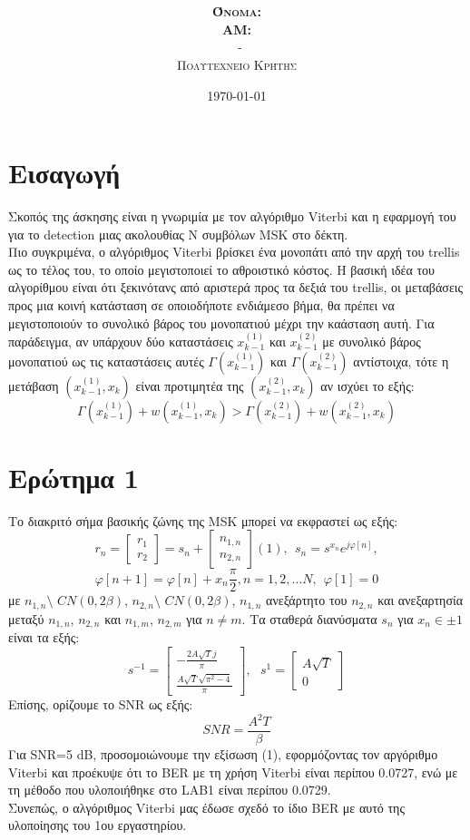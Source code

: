 \documentclass{article}
\title{\underline{\textbf{\assignmentNumber}}}
\author{\textsc{\textbf{Όνομα:}}  \studentName\\
		\textsc{\textbf{ΑΜ:}}  \studentNumber\\
		\course \ - \courseName\\ 
		\textsc{Πολυτεχνείο Κρήτης}
}
\date{\today}
\begin{document}
	\maketitle
\section{Εισαγωγή}
Σκοπός της άσκησης είναι η γνωριμία με τον αλγόριθμο Viterbi και η εφαρμογή του για το detection μιας ακολουθίας Ν συμβόλων MSK στο δέκτη.\\
Πιο συγκριμένα, ο αλγόριθμος Viterbi βρίσκει ένα μονοπάτι από την αρχή του trellis ως το τέλος του, το οποίο μεγιστοποιεί το αθροιστικό κόστος. Η βασική  ιδέα του αλγορίθμου είναι ότι ξεκινότανς από αριστερά προς τα δεξιά του trellis, οι μεταβάσεις προς μια κοινή κατάσταση σε οποιοδήποτε ενδιάμεσο βήμα, θα πρέπει να μεγιστοποιούν το συνολικό βάρος του μονοπατιού μέχρι την καάσταση αυτή.
Για παράδειγμα, αν υπάρχουν δύο καταστάσεις $x_{k-1}^{(1)}$ και $x_{k-1}^{(2)}$ με συνολικό βάρος μονοπατιού ως τις καταστάσεις αυτές $Γ(x_{k-1}^{(1)})$ και $Γ(x_{k-1}^{(2)})$ αντίστοιχα, τότε η μετάβαση $(x_{k-1}^{(1)},x_{k})$ είναι προτιμητέα της $(x_{k-1}^{(2)},x_{k})$ αν ισχύει το εξής:
$$Γ(x_{k-1}^{(1)}) + w(x_{k-1}^{(1)},x_{k}) > Γ(x_{k-1}^{(2)}) + w(x_{k-1}^{(2)},x_{k})$$

\section{Eρώτημα 1}
Το διακριτό σήμα βασικής ζώνης της MSK μπορεί να εκφραστεί ως εξής:
$$ r_{n} = 
\begin{bmatrix}
r_{1} \\
r_{2}
\end{bmatrix} = 
s_{n} + \begin{bmatrix}
			n_{1,n} \\
			n_{2,n}
		\end{bmatrix} (1), \  \  
s_{n} = s^{x_{n}}e^{jφ[n]}, $$
$$ 
φ[n+1] = φ[n] + x_{n}\frac{π}{2}, n = 1, 2, \dots N, \ \  φ[1] = 0
$$
με $n_{1,n} \texttt{\char`\~} CN(0,2β)$, $n_{2,n} \texttt{\char`\~} CN(0,2β)$, $n_{1,n}$ ανεξάρτητο του $n_{2,n}$ και ανεξαρτησία μεταξύ $n_{1,n}$, $n_{2,n}$ και $n_{1,m}$, $n_{2,m}$ για $n \ne m$. Τα σταθερά διανύσματα ${s_{n}}$ για $x_{n} \in { \pm 1}$ είναι τα εξής:
$$s^{-1} = 
\begin{bmatrix}
-\frac{2A\sqrt{T}j}{π} \\ 
\frac{A\sqrt{T}\sqrt{π^{2}-4}}{π}
\end{bmatrix}, \  \  \  
s^{1} = 
\begin{bmatrix}
	A\sqrt{T} \\ 
	0
\end{bmatrix}
$$
Επίσης, ορίζουμε το SNR ως εξής:
$$SNR = \frac{A^2T}{β}$$
Για SNR=5 dB, προσομοιώνουμε την εξίσωση (1), εφορμόζοντας τον αργόριθμο Viterbi και προέκυψε ότι το BER με τη χρήση Viterbi είναι περίπου 0.0727, ενώ με τη μέθοδο που υλοποιήθηκε στο LAB1 είναι περίπου 0.0729. \\
Συνεπώς, ο αλγόριθμος Viterbi μας έδωσε σχεδό το ίδιο BER με αυτό της υλοποίησης του 1ου εργαστηρίου.
\end{document}
